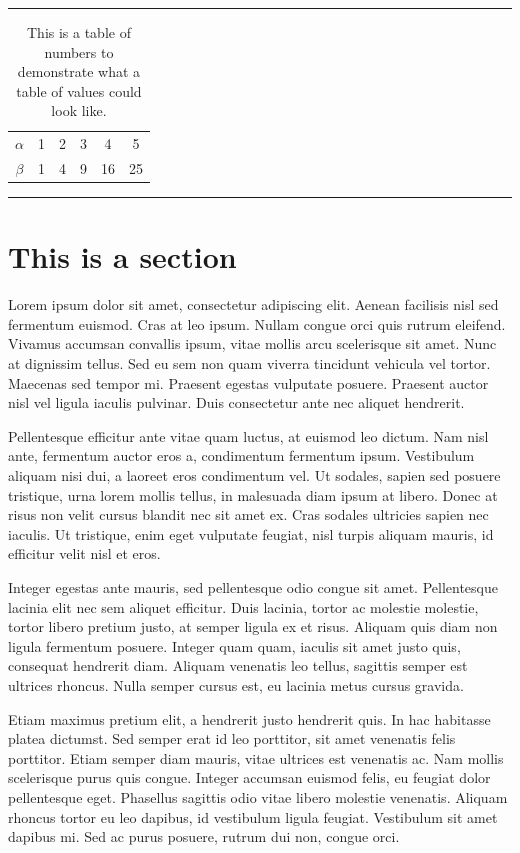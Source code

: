 \documentclass{icldt}
\begin{document}
\begin{table}[hp]
\centering
\hrule \vspace{0.5em}
\begin{tabular}{cccccc}
$\alpha$ & 1 & 2 & 3 & 4 & 5 \\
$\beta$ & 1 & 4 & 9 & 16 & 25 \\
\end{tabular}
\caption{This is a table of numbers to demonstrate what a table of values could look like.}
\vspace{0.5em} \hrule
\label{tab:example}
\end{table}

\section{This is a section}

Lorem ipsum dolor sit amet, consectetur adipiscing elit. Aenean facilisis nisl sed fermentum euismod. Cras at leo ipsum. Nullam congue orci quis rutrum eleifend. Vivamus accumsan convallis ipsum, vitae mollis arcu scelerisque sit amet. Nunc at dignissim tellus. Sed eu sem non quam viverra tincidunt vehicula vel tortor. Maecenas sed tempor mi. Praesent egestas vulputate posuere. Praesent auctor nisl vel ligula iaculis pulvinar. Duis consectetur ante nec aliquet hendrerit.

Pellentesque efficitur ante vitae quam luctus, at euismod leo dictum. Nam nisl ante, fermentum auctor eros a, condimentum fermentum ipsum. Vestibulum aliquam nisi dui, a laoreet eros condimentum vel. Ut sodales, sapien sed posuere tristique, urna lorem mollis tellus, in malesuada diam ipsum at libero. Donec at risus non velit cursus blandit nec sit amet ex. Cras sodales ultricies sapien nec iaculis. Ut tristique, enim eget vulputate feugiat, nisl turpis aliquam mauris, id efficitur velit nisl et eros.

Integer egestas ante mauris, sed pellentesque odio congue sit amet. Pellentesque lacinia elit nec sem aliquet efficitur. Duis lacinia, tortor ac molestie molestie, tortor libero pretium justo, at semper ligula ex et risus. Aliquam quis diam non ligula fermentum posuere. Integer quam quam, iaculis sit amet justo quis, consequat hendrerit diam. Aliquam venenatis leo tellus, sagittis semper est ultrices rhoncus. Nulla semper cursus est, eu lacinia metus cursus gravida.

Etiam maximus pretium elit, a hendrerit justo hendrerit quis. In hac habitasse platea dictumst. Sed semper erat id leo porttitor, sit amet venenatis felis porttitor. Etiam semper diam mauris, vitae ultrices est venenatis ac. Nam mollis scelerisque purus quis congue. Integer accumsan euismod felis, eu feugiat dolor pellentesque eget. Phasellus sagittis odio vitae libero molestie venenatis. Aliquam rhoncus tortor eu leo dapibus, id vestibulum ligula feugiat. Vestibulum sit amet dapibus mi. Sed ac purus posuere, rutrum dui non, congue orci.
\end{document}
